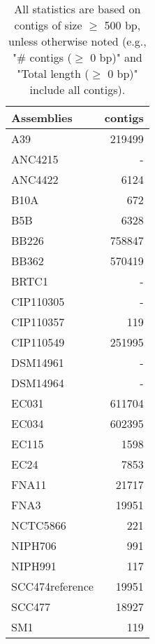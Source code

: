 \documentclass[12pt,a4paper]{article}
\begin{document}
\begin{table}[ht]
\begin{center}
\caption{All statistics are based on contigs of size $\geq$ 500 bp, unless otherwise noted (e.g., "\# contigs ($\geq$ 0 bp)" and "Total length ($\geq$ 0 bp)" include all contigs).}
\begin{tabular}{|l*{1}{|r}|}
\hline
Assemblies & contigs \\ \hline
A39 & 219499 \\ \hline
ANC4215 & - \\ \hline
ANC4422 & 6124 \\ \hline
B10A & 672 \\ \hline
B5B & 6328 \\ \hline
BB226 & 758847 \\ \hline
BB362 & 570419 \\ \hline
BRTC1 & - \\ \hline
CIP110305 & - \\ \hline
CIP110357 & 119 \\ \hline
CIP110549 & 251995 \\ \hline
DSM14961 & - \\ \hline
DSM14964 & - \\ \hline
EC031 & 611704 \\ \hline
EC034 & 602395 \\ \hline
EC115 & 1598 \\ \hline
EC24 & 7853 \\ \hline
FNA11 & 21717 \\ \hline
FNA3 & 19951 \\ \hline
NCTC5866 & 221 \\ \hline
NIPH706 & 991 \\ \hline
NIPH991 & 117 \\ \hline
SCC474reference & 19951 \\ \hline
SCC477 & 18927 \\ \hline
SM1 & 119 \\ \hline
\end{tabular}
\end{center}
\end{table}
\end{document}
